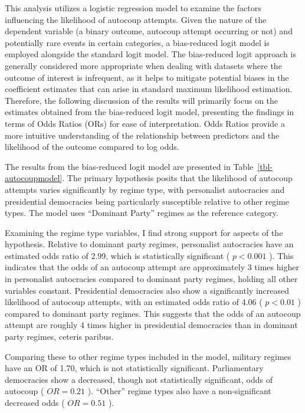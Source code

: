 \documentclass[
  12pt,
]{report}
\begin{document}
This analysis utilizes a logistic regression model to examine the
factors influencing the likelihood of autocoup attempts. Given the
nature of the dependent variable (a binary outcome, autocoup attempt
occurring or not) and potentially rare events in certain categories, a
bias-reduced logit model is employed alongside the standard logit model.
The bias-reduced logit approach is generally considered more appropriate
when dealing with datasets where the outcome of interest is infrequent,
as it helps to mitigate potential biases in the coefficient estimates
that can arise in standard maximum likelihood estimation. Therefore, the
following discussion of the results will primarily focus on the
estimates obtained from the bias-reduced logit model, presenting the
findings in terms of Odds Ratios (ORs) for ease of interpretation. Odds
Ratios provide a more intuitive understanding of the relationship
between predictors and the likelihood of the outcome compared to log
odds.

The results from the bias-reduced logit model are presented in
Table~\ref{tbl-autocoupmodel}. The primary hypothesis posits that the
likelihood of autocoup attempts varies significantly by regime type,
with personalist autocracies and presidential democracies being
particularly susceptible relative to other regime types. The model uses
``Dominant Party'' regimes as the reference category.

Examining the regime type variables, I find strong support for aspects
of the hypothesis. Relative to dominant party regimes, personalist
autocracies have an estimated odds ratio of 2.99, which is statistically
significant ( \(p<0.001\) ). This indicates that the odds of an autocoup
attempt are approximately 3 times higher in personalist autocracies
compared to dominant party regimes, holding all other variables
constant. Presidential democracies also show a significantly increased
likelihood of autocoup attempts, with an estimated odds ratio of 4.06 (
\(p<0.01\) ) compared to dominant party regimes. This suggests that the
odds of an autocoup attempt are roughly 4 times higher in presidential
democracies than in dominant party regimes, ceteris paribus.

Comparing these to other regime types included in the model, military
regimes have an OR of 1.70, which is not statistically significant.
Parliamentary democracies show a decreased, though not statistically
significant, odds of autocoup ( \(OR = 0.21\) ). ``Other'' regime types
also have a non-significant decreased odds ( \(OR = 0.51\) ).
\end{document}
